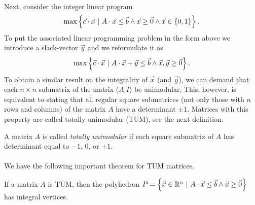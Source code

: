 {\paragraph{}
Next, consider the integer linear program
\begin{equation}
\max\left\{ \vec{c}\cdot\vec{x}\ |\ A\cdot\vec{x}\leq\vec{b}\wedge\vec{x}\geq\vec{0}\wedge\vec{x}\in\left\{ 0,1 \right\} \right\}.
\end{equation}
To put the associated linear programming problem in the form above we introduce a slack-vector $\vec{y}$ and we reformulate it as
\begin{equation}
\max\left\{ \vec{c}\cdot\vec{x}\ |\ A\cdot\vec{x}+\vec{y}\leq\vec{b}\wedge\vec{x},\vec{y}\geq\vec{0} \right\}.
\end{equation}
To obtain a similar result on the integrality of $\vec{x}$ (and $\vec{y}$), we can demand that each $n\times n$ submatrix of the matrix ($A|I$) be unimodular. This, however, is equivalent to stating that all regular square submatrices (not only those with $n$ rows and columns) of the matrix $A$ have a determinant $\pm 1$. Matrices with this property are called totally unimodular (TUM), see the next definition.

\begin{definition}
A matrix $A$ is called \emph{totally unimodular} if each square submatrix of $A$ has determinant equal to $-1$, $0$, or $+1$.
\end{definition}

\paragraph{}
We have the following important theorem for TUM matrices.

\begin{theorem}
If a matrix $A$ is TUM, then the polyhedron $P=\left\{ \vec{x}\in\mathbb{R}^n\ |\ A\cdot\vec{x}\leq\vec{b}\wedge\vec{x}\geq\vec{0} \right\}$ has integral vertices.
\end{theorem}

}

